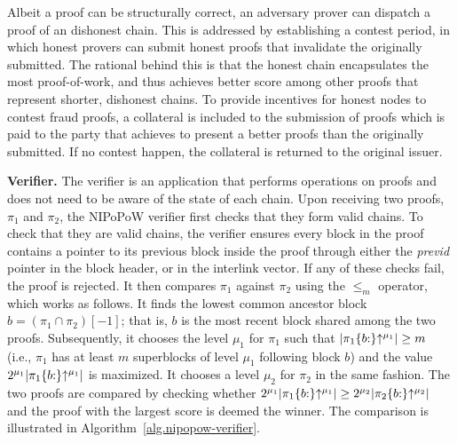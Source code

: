 Albeit a proof can be structurally correct, an adversary prover can dispatch a
proof of an dishonest chain. This is addressed by establishing a contest
period, in which honest provers can submit honest proofs that invalidate
the originally submitted. The rational behind this is that the honest chain
encapsulates the most proof-of-work, and thus achieves better score among
other proofs that represent shorter, dishonest chains. To provide incentives for honest
nodes to contest fraud proofs, a collateral is included to the submission of
proofs which is paid to the party that achieves to present a better proofs than
the originally submitted. If no contest happen, the collateral is returned to
the original issuer.



\noindent \textbf{Verifier.} The verifier is an application that performs
operations on proofs and does not need to be aware of the state of each chain.
Upon receiving two proofs, $\pi_1$ and $\pi_2$, the NIPoPoW verifier first
checks that they form valid chains. To check that they are valid chains, the
verifier ensures every block in the proof contains a pointer to its previous
block inside the proof through either the \emph{previd} pointer in the block
header, or in the interlink vector. If any of these checks fail, the proof is
rejected.  It then compares $\pi_1$ against $\pi_2$ using the $\leq_m$
operator, which works as follows. It finds the lowest common ancestor block $b
= (\pi_1 \cap \pi_2)[-1]$; that is, $b$ is the most recent block shared among
the two proofs.  Subsequently, it chooses the level $\mu_1$ for $\pi_1$ such
that $\lvert \pi_1\{b{:}\}\negthickspace\uparrow^{\mu_1} \rvert \geq m$ (i.e., $\pi_1$ has at
least $m$ superblocks of level $\mu_1$ following block $b$) and the value
$2^{\mu_1} \lvert \pi_1\{b{:}\}\negthickspace\uparrow^{\mu_1} \rvert$ is maximized.  It
chooses a level $\mu_2$ for $\pi_2$ in the same fashion. The two proofs are
compared by checking whether $2^{\mu_1} \lvert \pi_1\{b{:}\}\negthickspace\uparrow^{\mu_1}
\rvert \geq 2^{\mu_2} \lvert \pi_2\{b{:}\}\negthickspace\uparrow^{\mu_2} \rvert$ and the
proof with the largest score is deemed the winner. The comparison is
illustrated in Algorithm~\ref{alg.nipopow-verifier}.

